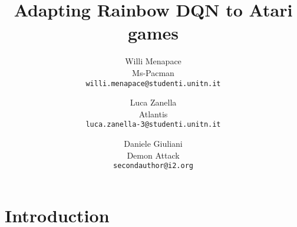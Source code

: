 \documentclass[10pt,twocolumn,letterpaper]{article}
\begin{document}
\title{Adapting Rainbow DQN to Atari games}

\author{Willi Menapace\\
Ms-Pacman\\
{\tt\small willi.menapace@studenti.unitn.it}
\and
Luca Zanella\\
Atlantis\\
{\tt\small luca.zanella-3@studenti.unitn.it}
\and
Daniele Giuliani\\
Demon Attack\\
{\tt\small secondauthor@i2.org}
}

\maketitle



\section{Introduction}
\end{document}
